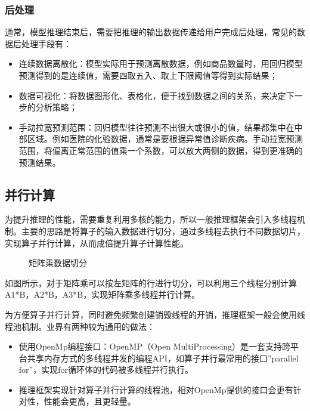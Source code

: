 \documentclass[letterpaper,10pt,english]{sphinxmanual}
\let\sphinxpxdimen\pdfpxdimen\else\newdimen\sphinxpxdimen
\begin{document}
\subsubsection{后处理}
\label{\detokenize{chapter_model_deployment/model_inference:id4}}
\sphinxAtStartPar
通常，模型推理结束后，需要把推理的输出数据传递给用户完成后处理，常见的数据后处理手段有：
\begin{itemize}
\item {} 
\sphinxAtStartPar
连续数据离散化：模型实际用于预测离散数据，例如商品数量时，用回归模型预测得到的是连续值，需要四取五入、取上下限阈值等得到实际结果；

\item {} 
\sphinxAtStartPar
数据可视化：将数据图形化、表格化，便于找到数据之间的关系，来决定下一步的分析策略；

\item {} 
\sphinxAtStartPar
手动拉宽预测范围：回归模型往往预测不出很大或很小的值，结果都集中在中部区域。例如医院的化验数据，通常是要根据异常值诊断疾病。手动拉宽预测范围，将偏离正常范围的值乘一个系数，可以放大两侧的数据，得到更准确的预测结果。

\end{itemize}


\subsection{并行计算}
\label{\detokenize{chapter_model_deployment/model_inference:ch08-sec-parallel-inference}}\label{\detokenize{chapter_model_deployment/model_inference:id5}}
\sphinxAtStartPar
为提升推理的性能，需要重复利用多核的能力，所以一般推理框架会引入多线程机制。主要的思路是将算子的输入数据进行切分，通过多线程去执行不同数据切片，实现算子并行计算，从而成倍提升算子计算性能。

\begin{figure}[H]
\centering
\capstart

\noindent\sphinxincludegraphics[width=800\sphinxpxdimen]{{parallel}.png}
\caption{矩阵乘数据切分}\label{\detokenize{chapter_model_deployment/model_inference:id9}}\label{\detokenize{chapter_model_deployment/model_inference:ch08-fig-parallel}}\end{figure}

\sphinxAtStartPar
如图所示，对于矩阵乘可以按左矩阵的行进行切分，可以利用三个线程分别计算A1*B，A2*B，A3*B，实现矩阵乘多线程并行计算。

\sphinxAtStartPar
为方便算子并行计算，同时避免频繁创建销毁线程的开销，推理框架一般会使用线程池机制。业界有两种较为通用的做法：
\begin{itemize}
\item {} 
\sphinxAtStartPar
使用OpenMp编程接口：OpenMP（Open
Multi\sphinxhyphen{}Processing）是一套支持跨平台共享内存方式的多线程并发的编程API，如算子并行最常用的接口”parallel
for”，实现for循环体的代码被多线程并行执行。

\item {} 
\sphinxAtStartPar
推理框架实现针对算子并行计算的线程池，相对OpenMp提供的接口会更有针对性，性能会更高，且更轻量。

\end{itemize}
\end{document}
